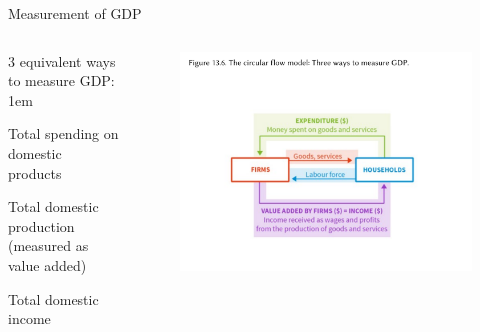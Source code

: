 \documentclass[11pt,aspectratio=43,usenames,dvipsnames]{beamer}
\let\oldenumerate=\enumerate
\let\endoldenumerate=\endenumerate
\renewenvironment{enumerate}{\oldenumerate \itemsep1em}{ \endoldenumerate}
\theoremstyle{definition}
\begin{document}
\begin{frame}{Measurement of GDP}
\label{slide:Measurement_of_GDP}
    \begin{columns}
        \begin{column}{0.3\textwidth}
            $ 3 $ equivalent ways to measure GDP:
            \begin{enumerate}
                \item Total spending on domestic products
                \item Total domestic production (measured as value added)
                \item Total domestic income
            \end{enumerate}
        \end{column}
        \begin{column}{0.7\textwidth}
            \begin{figure}
                \centering
                \includegraphics[width=\textwidth]{./figures/4.pdf}
            \end{figure}

        \end{column}
    \end{columns}

\end{frame}
\end{document}
